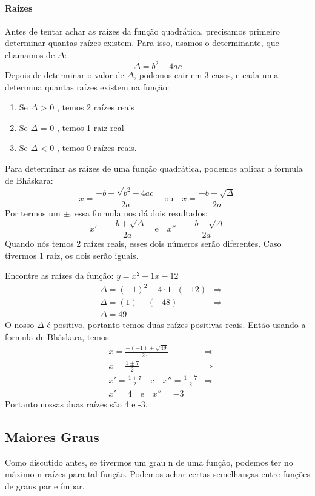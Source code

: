 \paragraph{Raízes} Antes de tentar achar as raízes da função quadrática, precisamos primeiro determinar quantas raízes existem. Para isso, usamos o determinante, que chamamos de $\Delta$:
\[\Delta = b^2-4ac\] Depois de determinar o valor de $\Delta$, podemos cair em 3 casos, e cada uma determina quantas raízes existem na função: 
\begin{enumerate}
\item Se $\Delta$ > 0 , temos 2 raízes reais
\item Se $\Delta$ = 0 , temos 1 raiz real
\item Se $\Delta$ < 0 , temos 0 raízes reais.
\end{enumerate}
\par Para determinar as raízes de uma função quadrática, podemos aplicar a formula de Bháskara:
\[x= \frac{-b \pm \sqrt{b^2-4ac}}{2a} \quad \textrm{ou} \quad x= \frac{-b \pm \sqrt{\Delta}}{2a} \]
Por termos um $\pm$, essa formula nos dá dois resultados:
\[x' = \frac{-b + \sqrt{\Delta}}{2a} \quad \textrm{e} \quad x''= \frac{-b - \sqrt{\Delta}}{2a}\]
Quando nós temos 2 raízes reais, esses dois números serão diferentes. Caso tivermos 1 raiz, os dois serão iguais.
\begin{exemplo}
Encontre as raízes da função: $y=x^2-1x-12$
\begin{align*}
& \Delta=(-1)^2-4\cdot 1 \cdot (-12) &\Rightarrow\\
& \Delta=(1)-(-48) &\Rightarrow\\
& \Delta=49
\end{align*}
O nosso $\Delta$ é positivo, portanto temos duas raízes positivas reais. Então usando a formula de Bháskara, temos:
\begin{align*}
&x=\frac{-(-1)\pm \sqrt{49}}{2\cdot 1}& \Rightarrow\\
&x=\frac{1\pm 7}{2} & \Rightarrow\\
&x'=\frac{1+7}{2} \quad \textrm{e} \quad x''= \frac{1-7}{2}& \Rightarrow\\
&x'=4 \quad \textrm{e} \quad x''= -3&
\end{align*}
Portanto nossas duas raízes são 4 e -3.
\end{exemplo}


\subsection{Maiores Graus}
Como discutido antes, se tivermos um grau n de uma função, podemos ter no máximo n raízes para tal função.  Podemos achar certas semelhanças entre funções de graus par e ímpar. 

